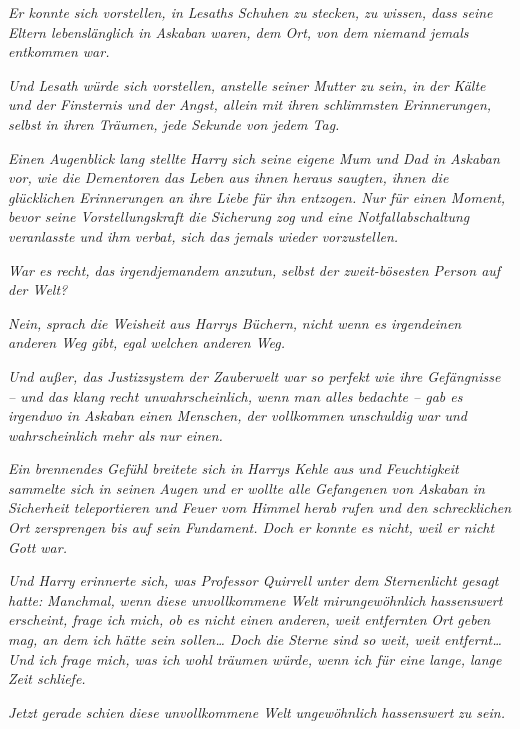 {\emph{Er konnte sich vorstellen, in Lesaths Schuhen zu stecken, zu wissen, dass seine Eltern lebenslänglich in Askaban waren, dem Ort, von dem niemand jemals entkommen war.}

\emph{Und Lesath würde sich vorstellen, anstelle seiner Mutter zu sein, in der Kälte und der Finsternis und der Angst, allein mit ihren schlimmsten Erinnerungen, selbst in ihren Träumen, jede Sekunde von jedem Tag.}

\emph{Einen Augenblick lang stellte Harry sich seine eigene Mum und Dad in Askaban vor, wie die Dementoren das Leben aus ihnen heraus saugten, ihnen die glücklichen Erinnerungen an ihre Liebe für ihn entzogen. Nur für einen Moment, bevor seine Vorstellungskraft die Sicherung zog und eine Notfallabschaltung veranlasste und ihm verbat, sich das jemals wieder vorzustellen.}

\emph{War es recht,} \emph{das} \emph{irgendjemandem anzutun, selbst der zweit-bösesten Person auf der Welt?}

\emph{\emph{Nein,}} \emph{sprach} \emph{die Weisheit aus Harrys Büchern,} \emph{\emph{nicht wenn es irgendeinen anderen Weg gibt, egal welchen anderen Weg.}}

\emph{Und außer, das Justizsystem der Zauberwelt war so perfekt wie ihre Gefängnisse -- und das klang recht unwahrscheinlich, wenn man alles bedachte -- gab es irgendwo in Askaban einen Menschen, der vollkommen} \emph{unschuldig war und wahrscheinlich mehr als nur einen.}

\emph{Ein brennendes Gefühl breitete sich in Harrys Kehle aus und Feuchtigkeit sammelte sich in seinen Augen und er wollte alle Gefangenen von Askaban in Sicherheit teleportieren und Feuer vom Himmel herab rufen und den schrecklichen Ort} \emph{zersprengen bis auf sein Fundament. Doch er konnte es nicht, weil er nicht Gott war.}

\emph{Und Harry erinnerte sich, was Professor Quirrell unter dem Sternenlicht gesagt hatte:} \emph{\emph{Manchmal,}} \emph{\emph{wenn diese unvollkommene Welt}} \emph{\emph{mir}\emph{ungewöhnlich}} \emph{\emph{hassenswert erscheint, frage ich mich, ob es nicht einen anderen,}} \emph{\emph{weit entfernten}} \emph{\emph{Ort}} \emph{\emph{geben mag}\emph{, an dem ich hätte sein sollen}\emph{… Doch die Sterne sind so weit, weit entfernt… Und ich frage mich, was ich wohl träumen würde, wenn ich für eine lange, lange Zeit schliefe.}}

\emph{Jetzt gerade schien diese unvollkommene Welt} \emph{ungewöhnlich} \emph{hassenswert} \emph{zu sein.}

}
